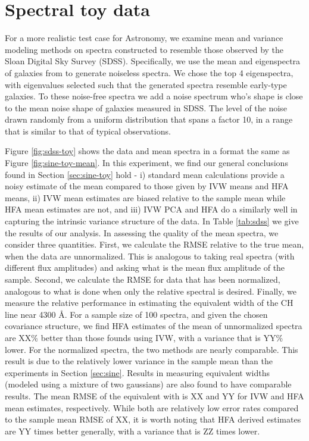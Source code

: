 \documentclass[12pt,preprint]{aastex}
\begin{document}
\section{Spectral toy data}
\label{sec:sdss}

For a more realistic test case for Astronomy, we examine mean and variance modeling 
methods on spectra constructed to resemble those observed by the Sloan Digital Sky 
Survey (SDSS).  Specifically, we use the mean and eigenspectra of galaxies from \citet{yip04} 
to generate noiseless spectra.  We chose the top 4 eigenspectra, with eigenvalues 
selected such that the generated spectra resemble early-type galaxies.  To these 
noise-free spectra we add a noise spectrum who's shape is close to the mean noise 
shape of galaxies measured in SDSS.  The level of the noise drawn randomly from 
a uniform distribution that spans a factor 10, in a range that is similar to that of typical 
observations.  

Figure \ref{fig:sdss-toy} shows the data and mean spectra in a format the same as 
Figure \ref{fig:sine-toy-mean}.  In this experiment, we find our general conclusions found 
in Section \ref{sec:sine-toy} hold - i) standard mean calculations provide a noisy 
estimate of the mean compared to those given by IVW means and HFA means, 
ii) IVW mean estimates are biased relative to the sample mean while HFA mean 
estimates are not, and iii) IVW PCA and HFA do a similarly well in capturing the intrinsic 
variance structure of the data.  In Table \ref{tab:sdss} we give the results of our 
analysis.  In assessing the quality of the mean spectra, we consider three quantities.  
First, we calculate the RMSE relative to the true mean, when the data are unnormalized.  
This is analogous to taking real spectra (with different flux amplitudes) and asking what 
is the mean flux amplitude of the sample.  Second, we calculate the RMSE for data that 
has been normalized, analogous to what is done when only the relative spectral is 
desired.  Finally, we measure the relative performance in estimating the equivalent width 
of the CH line near 4300 \AA.  For a sample size of 100 spectra, and given the chosen 
covariance structure, we find HFA estimates of the mean of unnormalized spectra are 
XX\% better than those founds using IVW, with a variance that is YY\% lower.  For the 
normalized spectra, the two methods are nearly comparable.  This result is due to the 
relatively lower variance in the sample mean than the experiments in Section 
\ref{sec:sine}.  Results in measuring equivalent widths (modeled using a mixture of 
two gaussians) are also found to have comparable results.  The mean RMSE of the 
equivalent with is XX and YY for IVW and HFA mean estimates, respectively.  While both 
are relatively low error rates compared to the sample mean RMSE of XX, it is worth 
noting that HFA derived estimates are YY times better generally, with a variance that 
is ZZ times lower.  
\end{document}
